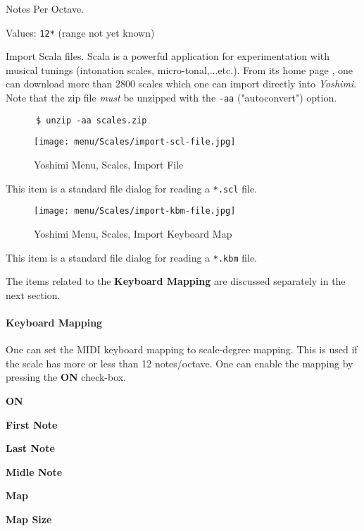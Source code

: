    Notes Per Octave.

   Values: \texttt{12*} (range not yet known)

   Import Scala files.
   Scala is a powerful application for experimentation with musical tunings
   (intonation scales, micro-tonal,...etc.). From its home page \cite{scala},
   one can download more than 2800 scales which one can import directly into
   \textsl{Yoshimi}.  Note that the zip file \textsl{must} be unzipped with
   the \texttt{-aa} ("autoconvert") option.

    \begin{verbatim}
      $ unzip -aa scales.zip
    \end{verbatim}

\begin{figure}[H]
   \centering 
   \texttt{[image: menu/Scales/import-scl-file.jpg]}
   \caption{Yoshimi Menu, Scales, Import File}
   \label{fig:yoshimi_menu_scales_import_file}
\end{figure}

   This item is a standard file dialog for reading
   a \texttt{*.scl} file.

\begin{figure}[H]
   \centering 
   \texttt{[image: menu/Scales/import-kbm-file.jpg]}
   \caption{Yoshimi Menu, Scales, Import Keyboard Map}
   \label{fig:yoshimi_menu_scales_import_keyboard_map}
\end{figure}

   This item is a standard file dialog for reading
   a \texttt{*.kbm} file.


   The items related to the \textbf{Keyboard Mapping} are discussed
   separately in the next section.

\paragraph{Keyboard Mapping}
\label{paragraph:menu_scales_keyboard_mapping}

   One can set the MIDI keyboard mapping to scale-degree mapping.
   This is used if the scale has more or less than 12 notes/octave.
   One can enable the mapping by pressing the \textbf{ON} check-box.

   \begin{enumber}
      \item \textbf{ON}
      \item \textbf{First Note}
      \item \textbf{Last Note}
      \item \textbf{Midle Note}
      \item \textbf{Map}
      \item \textbf{Map Size}
   \end{enumber}

